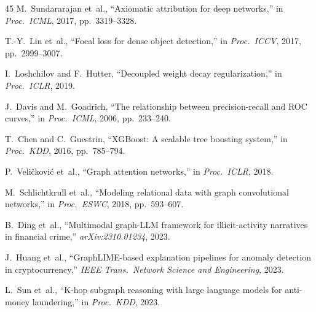 \documentclass[journal]{IEEEtran}
\begin{document}
\begin{thebibliography}{45}
 M.~Sundararajan et~al., ``Axiomatic attribution for deep networks,'' in \emph{Proc.\ ICML}, 2017, pp.~3319--3328.

 T.-Y.~Lin et~al., ``Focal loss for dense object detection,'' in \emph{Proc.\ ICCV}, 2017, pp.~2999--3007.

 I.~Loshchilov and F.~Hutter, ``Decoupled weight decay regularization,'' in \emph{Proc.\ ICLR}, 2019.

 J.~Davis and M.~Goadrich, ``The relationship between precision-recall and ROC curves,'' in \emph{Proc.\ ICML}, 2006, pp.~233--240.

 T.~Chen and C.~Guestrin, ``XGBoost: A scalable tree boosting system,'' in \emph{Proc.\ KDD}, 2016, pp.~785--794.

 P.~Veli\v{c}kovi\'{c} et~al., ``Graph attention networks,'' in \emph{Proc.\ ICLR}, 2018.

 M.~Schlichtkrull et~al., ``Modeling relational data with graph convolutional networks,'' in \emph{Proc.\ ESWC}, 2018, pp.~593--607.

 B.~Ding et~al., ``Multimodal graph-LLM framework for illicit-activity narratives in financial crime,'' \emph{arXiv:2310.01234}, 2023.

 J.~Huang et~al., ``GraphLIME-based explanation pipelines for anomaly detection in cryptocurrency,'' \emph{IEEE Trans.\ Network Science and Engineering}, 2023.

 L.~Sun et~al., ``K-hop subgraph reasoning with large language models for anti-money laundering,'' in \emph{Proc.\ KDD}, 2023.

\end{thebibliography}
\end{document}

